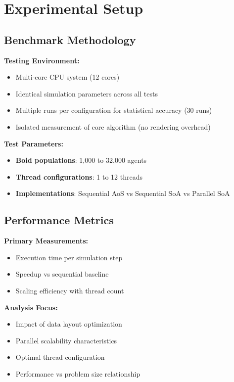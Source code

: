\chapter{Experimental Setup}

\section{Benchmark Methodology}

\textbf{Testing Environment:}
\begin{itemize}
    \item Multi-core CPU system (12 cores)
    \item Identical simulation parameters across all tests
    \item Multiple runs per configuration for statistical accuracy (30 runs)
    \item Isolated measurement of core algorithm (no rendering overhead)
\end{itemize}

\textbf{Test Parameters:}
\begin{itemize}
    \item \textbf{Boid populations}: 1,000 to 32,000 agents
    \item \textbf{Thread configurations}: 1 to 12 threads
    \item \textbf{Implementations}: Sequential AoS vs Sequential SoA vs Parallel SoA
\end{itemize}

\section{Performance Metrics}

\textbf{Primary Measurements:}
\begin{itemize}
    \item Execution time per simulation step
    \item Speedup vs sequential baseline
    \item Scaling efficiency with thread count
\end{itemize}

\textbf{Analysis Focus:}
\begin{itemize}
    \item Impact of data layout optimization
    \item Parallel scalability characteristics  
    \item Optimal thread configuration
    \item Performance vs problem size relationship
\end{itemize}


